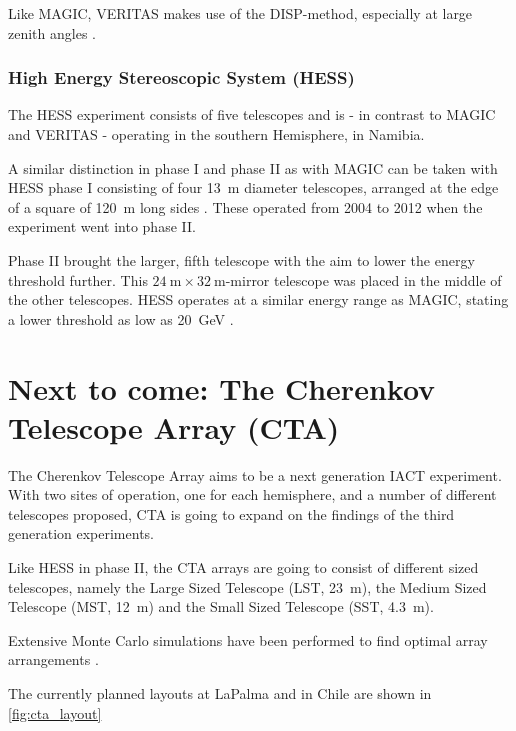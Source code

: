 Like MAGIC, VERITAS makes use of the DISP-method, especially at large zenith angles 
\cite{2015ICRC...34..771P}.

\subsubsection{High Energy Stereoscopic System (HESS)}

The HESS experiment consists of five telescopes and 
is - in contrast to MAGIC and VERITAS - operating in the southern 
Hemisphere, in Namibia.

A similar distinction in phase I and phase II as with MAGIC can be taken with 
HESS phase I consisting of four \SI{13}{\meter} diameter telescopes,
arranged at the edge of a square of \SI{120}{\meter} long sides \cite{HINTON2004331}.
These operated from 2004 to 2012 when the experiment went into phase II.

Phase II brought the larger, fifth telescope with the aim to lower the energy threshold
further. This $\SI{24}{\meter} \times \SI{32}{\meter}$-mirror telescope 
was placed in the middle of the other telescopes.
HESS operates at a similar energy range as MAGIC, stating a lower threshold as low as 
\SI{20}{\giga\electronvolt} \cite{vincent2005hess}.


\section{Next to come: The Cherenkov Telescope Array (CTA)}
\label{sec:cta}

The Cherenkov Telescope Array aims to be a next generation IACT experiment.
With two sites of operation, one for each hemisphere, and a number of different 
telescopes proposed, CTA is going to expand on the findings of the third 
generation experiments.

Like HESS in phase II, the CTA arrays are going to consist of different sized telescopes, namely
the Large Sized Telescope (LST, \SI{23}{\meter}), 
the Medium Sized Telescope (MST, \SI{12}{\meter}) 
and the Small Sized Telescope (SST, \SI{4.3}{\meter}).

Extensive Monte Carlo simulations have been performed to find optimal array arrangements
\cite{BERNLOHR2013171}.

The currently planned layouts at LaPalma and in Chile are shown in 
\ref{fig:cta_layout}

